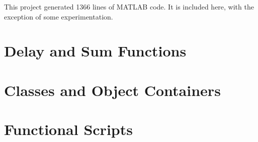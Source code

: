 This project generated 1366 lines of MATLAB code. It is included here, with the exception of some experimentation.

\label{app:matlab_code}
\lstset{language=Matlab, style=Matlab-editor}

\section{Delay and Sum Functions}
\label{appB:matlab_functions}






\section{Classes and Object Containers}
\label{appB:matlab_OOP}





\section{Functional Scripts}
\label{appB:matlab_scripts}



